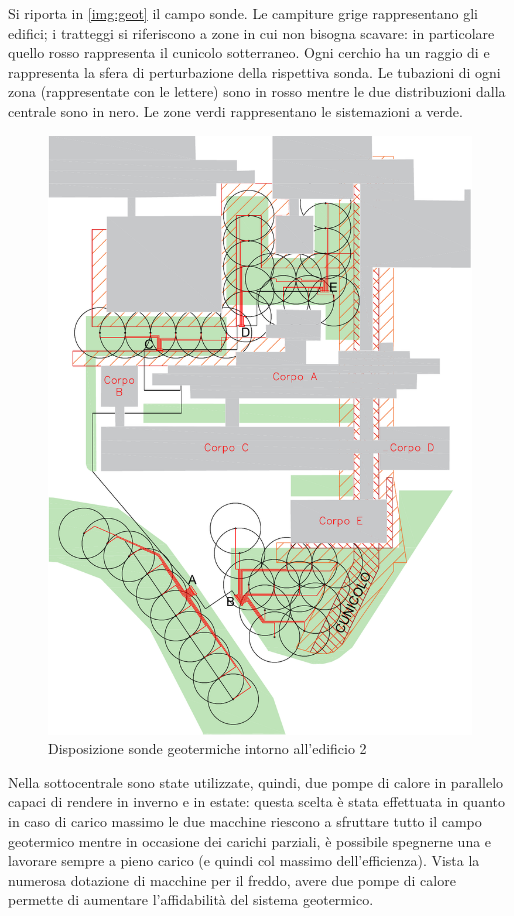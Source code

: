 Si riporta in \vref{img:geot} il campo sonde. Le campiture grige rappresentano gli edifici; i tratteggi si riferiscono a zone in cui non bisogna scavare: in particolare quello rosso rappresenta il cunicolo sotterraneo. Ogni cerchio ha un raggio di  e rappresenta la sfera di perturbazione della rispettiva sonda. Le tubazioni di ogni zona (rappresentate con le lettere) sono in rosso mentre le due distribuzioni dalla centrale sono in nero. Le zone verdi rappresentano le sistemazioni a verde.
%
\begin{figure}
	\centering
	\includegraphics[width=\hsize]{6_4_cap/img/geot}
	\caption{Disposizione sonde geotermiche intorno all'edificio 2}
	\label{img:geot}
\end{figure}

Nella sottocentrale sono state utilizzate, quindi, due pompe di calore in parallelo capaci di rendere in inverno  e  in estate: questa scelta è stata effettuata in quanto in caso di carico massimo le due macchine riescono a sfruttare tutto il campo geotermico mentre in occasione dei carichi parziali, è possibile spegnerne una e lavorare sempre a pieno carico (e quindi col massimo dell'efficienza). Vista la numerosa dotazione di macchine per il freddo, avere due pompe di calore permette di aumentare l'affidabilità del sistema geotermico.
